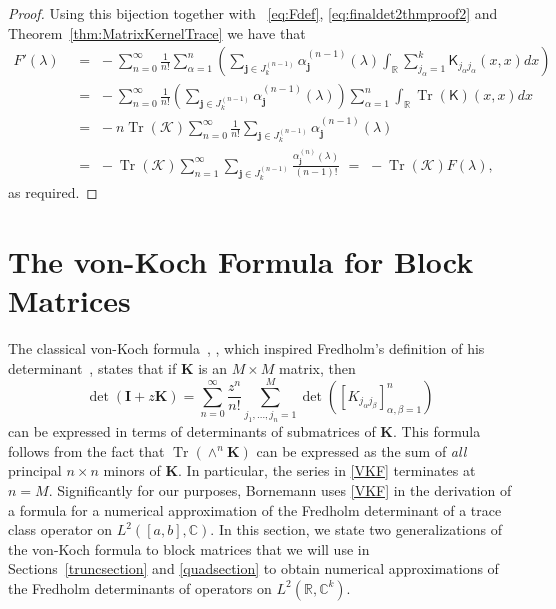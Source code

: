\documentclass{birkjour}
\theoremstyle{definition}
\theoremstyle{remark}
\numberwithin{equation}{section}
\begin{document}
\begin{proof}
Using this bijection together with ~\eqref{eq:Fdef}, \eqref{eq:finaldet2thmproof2}
and Theorem~\ref{thm:MatrixKernelTrace}
we have that
\begin{align} \nonumber
   F'(\lambda)
    &\,\,=\,\, - \sum_{n=0}^{\infty} \frac{1}{n!} \sum_{\alpha=1}^n \left( \sum_{\mathbf{j} \in J^{(n-1)}_{k}}   \alpha^{(n-1)}_{\mathbf{j}}(\lambda) \int_{\mathbb{R}} \sum_{j_{\alpha}=1}^k \textsf{K}_{j_{\alpha}j_{\alpha}}(x,x)dx \right) \\ \nonumber
    &\,\,=\,\,  - \sum_{n=0}^{\infty} \frac{1}{n!}  \left( \sum_{\mathbf{j} \in J^{(n-1)}_{k}} \alpha^{(n-1)}_{\mathbf{j}}(\lambda) \right) \sum_{\alpha=1}^n \int_{\mathbb{R}} \operatorname{Tr}(\textsf{K})(x,x)dx\\ \nonumber
&\,\,=\,\, -n \operatorname{Tr}(\mathcal{K}) \sum_{n=0}^{\infty} \frac{1}{n!} \sum_{\mathbf{j} \in J^{(n-1)}_{k}} \alpha^{(n-1)}_{\mathbf{j}}(\lambda)\\ \nonumber
&\,\,=\,\, -\operatorname{Tr}(\mathcal{K}) \sum_{n=1}^{\infty} \sum_{\mathbf{j} \in J^{(n-1)}_k} \frac{\alpha^{(n)}_{\mathbf{j}}(\lambda)}{(n-1)!}
\,\,=\,\, -\operatorname{Tr}(\mathcal{K}) F(\lambda),
\end{align}
 as required.
\end{proof}



\section{The von-Koch Formula for Block Matrices}\label{vonKochsection}


The classical von-Koch formula~\cite{vonkoch1892}, \cite[Section 3]{Bornemann},
which inspired Fredholm's definition of his determinant~\cite{Fred1903},
 states that if $\mathbf{K}$ is an $M\times M$ matrix, then 
\begin{equation}\label{VKF}
    \det(\mathbf{I} + z\mathbf{K}) = \sum_{n=0}^{\infty} \frac{z^n}{n!} \sum_{j_1, \dots, j_n = 1}^M \det\left( [{K}_{j_\alpha j_\beta}]_{\alpha,\beta=1}^n \right)
\end{equation}
can be expressed in terms of
determinants of submatrices of $\mathbf{K}$. This formula follows from the fact that 
$\operatorname{Tr}(\wedge^n \mathbf{K})$ can be expressed as the sum of \emph{all} 
 principal $n \times n$ minors of $\mathbf{K}$.
 In particular, the series in \eqref{VKF} terminates at $n=M$.
  Significantly for our purposes, 
Bornemann uses \eqref{VKF} in the derivation of a formula for a numerical approximation of the  Fredholm determinant of a trace class operator on $L^2([a,b], \mathbb{C}).$ In this section, we state two generalizations of the von-Koch formula to block matrices
 that we will use in Sections~\ref{truncsection} and \ref{quadsection} to obtain numerical approximations of the Fredholm determinants of 
 operators on $L^2(\mathbb{R},\mathbb{C}^k)$.
\end{document}
